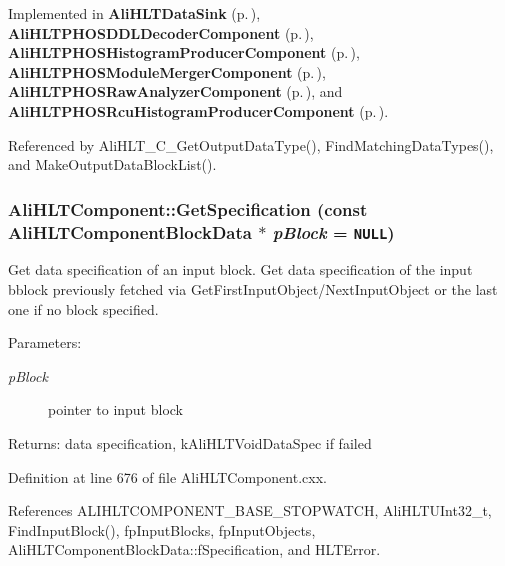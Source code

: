 Implemented in {\bf Ali\-HLTData\-Sink} {\rm (p.\,\pageref{classAliHLTDataSink_a4})}, {\bf Ali\-HLTPHOSDDLDecoder\-Component} {\rm (p.\,\pageref{classAliHLTPHOSDDLDecoderComponent_a12})}, {\bf Ali\-HLTPHOSHistogram\-Producer\-Component} {\rm (p.\,\pageref{classAliHLTPHOSHistogramProducerComponent_a12})}, {\bf Ali\-HLTPHOSModule\-Merger\-Component} {\rm (p.\,\pageref{classAliHLTPHOSModuleMergerComponent_a12})}, {\bf Ali\-HLTPHOSRaw\-Analyzer\-Component} {\rm (p.\,\pageref{classAliHLTPHOSRawAnalyzerComponent_a14})}, and {\bf Ali\-HLTPHOSRcu\-Histogram\-Producer\-Component} {\rm (p.\,\pageref{classAliHLTPHOSRcuHistogramProducerComponent_a7})}.

Referenced by Ali\-HLT\_\-C\_\-Get\-Output\-Data\-Type(), Find\-Matching\-Data\-Types(), and Make\-Output\-Data\-Block\-List().
\subsubsection{ Ali\-HLTComponent::Get\-Specification (const {\bf Ali\-HLTComponent\-Block\-Data} $\ast$ {\em p\-Block} = {\tt NULL})\hspace{0.3cm}{\tt  [protected]}}\label{classAliHLTComponent_b22}


Get data specification of an input block. Get data specification of the input bblock previously fetched via Get\-First\-Input\-Object/Next\-Input\-Object or the last one if no block specified. \begin{Desc}
\item[Parameters:]
\begin{description}
\item[{\em p\-Block}]pointer to input block \end{description}
\end{Desc}
\begin{Desc}
\item[Returns:]data specification, k\-Ali\-HLTVoid\-Data\-Spec if failed \end{Desc}


Definition at line 676 of file Ali\-HLTComponent.cxx.

References ALIHLTCOMPONENT\_\-BASE\_\-STOPWATCH, Ali\-HLTUInt32\_\-t, Find\-Input\-Block(), fp\-Input\-Blocks, fp\-Input\-Objects, Ali\-HLTComponent\-Block\-Data::f\-Specification, and HLTError.

